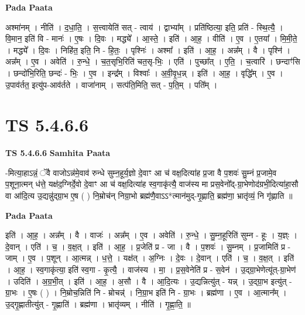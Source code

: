 \documentclass[17pt]{extarticle}
\begin{document}
\textbf{Pada Paata} \newline

अश्मा॑नम् । नीति॑ । द॒धा॒ति॒ । स॒त्त्वायेति॑ सत् - त्वाय॑ । द्वाभ्या᳚म् । प्रति॑ष्ठित्या॒ इति॒ प्रति॑ - स्थि॒त्यै॒ । वि॒मान॒ इति॑ वि - मानः॑ । ए॒षः । दि॒वः । मद्ध्ये᳚ । आ॒स्ते॒ । इति॑ । आ॒ह॒ । वीति॑ । ए॒व । ए॒तया᳚ । मि॒मी॒ते॒ । मद्ध्ये᳚ । दि॒वः । निहि॑त॒ इति॒ नि - हि॒तः॒ । पृश्निः॑ । अश्मा᳚ । इति॑ । आ॒ह॒ । अन्न᳚म् । वै । पृश्नि॑ । अन्न᳚म् । ए॒व । अवेति॑ । रु॒न्धे॒ । च॒त॒सृभि॒रिति॑ चत॒सृ-भिः॒ । एति॑ । पुच्छा᳚त् । ए॒ति॒ । च॒त्वारि॑ । छन्दाꣳ॑सि । छन्दो॑भि॒रिति॒ छन्दः॑ - भिः॒ । ए॒व । इन्द्र᳚म् । विश्वाः᳚ । अ॒वी॒वृ॒ध॒न्न् । इति॑ । आ॒ह॒ । वृद्धि᳚म् । ए॒व । उ॒पाव॑र्तत॒ इत्यु॑प-आव॑र्तते । वाजा॑नाम् । सत्प॑ति॒मिति॒ सत् - प॒ति॒म् । पति᳚म् ।  \newline




\section*{ TS 5.4.6.6 }

\textbf{TS 5.4.6.6 } \newline
\textbf{Samhita Paata} \newline

-मित्या॒हाऽन्नं॒ ॅवै वाजोऽन्न॑मे॒वाव॑ रुन्धे सुम्न॒हूर्य॒ज्ञो दे॒वाꣳ आ च॑ वक्ष॒दित्या॑ह प्र॒जा वै प॒शवः॑ सु॒म्नं प्र॒जामे॒व प॒शूना॒त्मन् ध॑त्ते॒ यक्ष॑द॒ग्निर्दे॒वो दे॒वाꣳ आ च॑ वक्ष॒दित्या॑ह स्व॒गाकृ॑त्यै॒ वाज॑स्य मा प्रस॒वेनो᳚द्-ग्रा॒भेणोद॑ग्रभी॒दित्या॑हा॒सौ वा आ॑दि॒त्य उ॒द्यन्नु॑द्ग्रा॒भ ए॒ष ( ) नि॒म्रोच॑न् निग्रा॒भो ब्रह्म॑णै॒वाऽऽ*त्मान॑मुद्-गृ॒ह्णाति॒ ब्रह्म॑णा॒ भ्रातृ॑व्यं॒ नि गृ॑ह्णाति ॥ \newline

\textbf{Pada Paata} \newline

इति॑ । आ॒ह॒ । अन्न᳚म् । वै । वाजः॑ । अन्न᳚म् । ए॒व । अवेति॑ । रु॒न्धे॒ । सु॒म्न॒हूरिति॑ सुम्न - हूः । य॒ज्ञ्ः । दे॒वान् । एति॑ । च॒ । व॒क्ष॒त् । इति॑ । आ॒ह॒ । प्र॒जेति॑ प्र - जा । वै । प॒शवः॑ । सु॒म्नम् । प्र॒जामिति॑ प्र - जाम् । ए॒व । प॒शून् । आ॒त्मन्न् । ध॒त्ते॒ । यक्ष॑त् । अ॒ग्निः । दे॒वः । दे॒वान् । एति॑ । च॒ । व॒क्ष॒त् । इति॑ । आ॒ह॒ । स्व॒गाकृ॑त्या॒ इति॑ स्व॒गा - कृ॒त्यै॒ । वाज॑स्य । मा॒ । प्र॒स॒वेनेति॑ प्र - स॒वेन॑ । उ॒द्ग्रा॒भेणेत्यू॑त्-ग्रा॒भेण॑ । उदिति॑ । अ॒ग्र॒भी॒त् । इति॑ । आ॒ह॒ । अ॒सौ । वै । आ॒दि॒त्यः । उ॒द्यन्नित्यु॑त् - यन्न् । उ॒द्ग्रा॒भ इत्यु॑त् - ग्रा॒भः । ए॒षः ( ) । नि॒म्रोच॒न्निति॑ नि - म्रोचन्न्॑ । नि॒ग्रा॒भ इति॑ नि - ग्रा॒भः । ब्रह्म॑णा । ए॒व । आ॒त्मान᳚म् । उ॒द्गृ॒ह्णातीत्यु॑त् - गृ॒ह्णाति॑ । ब्रह्म॑णा । भ्रातृ॑व्यम् । नीति॑ । गृ॒ह्णा॒ति॒ ॥  \newline
\end{document}
